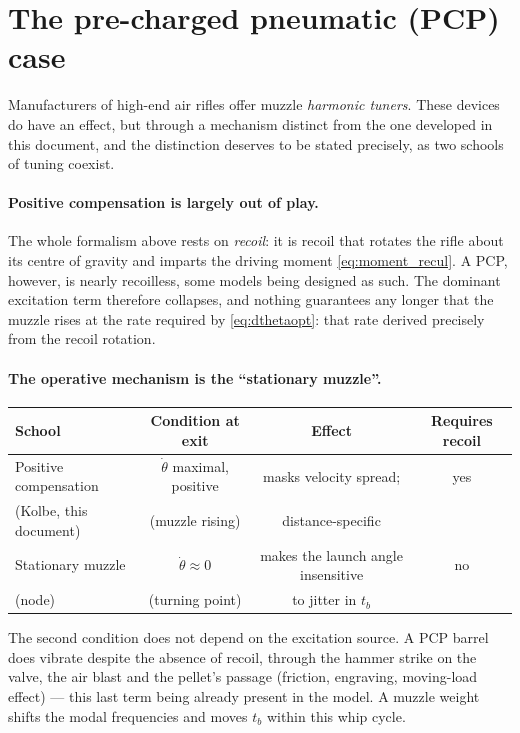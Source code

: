 \documentclass[12pt,a4paper]{article}
\begin{document}
	\section{The pre-charged pneumatic (PCP) case}
	\label{sec:pcp}

	Manufacturers of high-end air rifles offer muzzle \emph{harmonic tuners}. These devices do have an effect, but through a mechanism distinct from the one developed in this document, and the distinction deserves to be stated precisely, as two schools of tuning coexist.

	\paragraph{Positive compensation is largely out of play.} The whole formalism above rests on \emph{recoil}: it is recoil that rotates the rifle about its centre of gravity and imparts the driving moment \eqref{eq:moment_recul}. A PCP, however, is nearly recoilless, some models being designed as such. The dominant excitation term therefore collapses, and nothing guarantees any longer that the muzzle rises at the rate required by \eqref{eq:dthetaopt}: that rate derived precisely from the recoil rotation.

	\paragraph{The operative mechanism is the ``stationary muzzle''.}
	\begin{center}
	\begin{tabular}{lccc}
		\toprule
		School & Condition at exit & Effect & Requires recoil \\
		\midrule
		Positive compensation & $\dot\theta$ maximal, positive & masks velocity spread; & yes \\
		(Kolbe, this document) & (muzzle rising) & distance-specific & \\
		Stationary muzzle & $\dot\theta \approx 0$ & makes the launch angle insensitive & no \\
		(node) & (turning point) & to jitter in $t_b$ & \\
		\bottomrule
	\end{tabular}
	\end{center}

	The second condition does not depend on the excitation source. A PCP barrel does vibrate despite the absence of recoil, through the hammer strike on the valve, the air blast and the pellet's passage (friction, engraving, moving-load effect) --- this last term being already present in the model. A muzzle weight shifts the modal frequencies and moves $t_b$ within this whip cycle.
\end{document}
